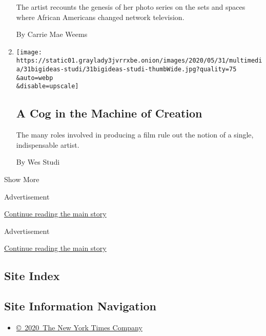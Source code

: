 \begin{enumerate}
  The artist recounts the genesis of her photo series on the sets and
  spaces where African Americans changed network television.

  By Carrie Mae Weems
\item
  \href{/2020/05/31/opinion/acting-movies-art.html}{}

  \texttt{[image: https://static01.graylady3jvrrxbe.onion/images/2020/05/31/multimedia/31bigideas-studi/31bigideas-studi-thumbWide.jpg?quality=75\\\&auto=webp\\\&disable=upscale]}

  \hypertarget{a-cog-in-the-machine-of-creation}{%
  \subsection{A Cog in the Machine of
  Creation}\label{a-cog-in-the-machine-of-creation}}

  The many roles involved in producing a film rule out the notion of a
  single, indispensable artist.

  By Wes Studi
\end{enumerate}

Show More

Advertisement

\protect\hyperlink{after-mid1}{Continue reading the main story}

Advertisement

\protect\hyperlink{after-mktg}{Continue reading the main story}

\hypertarget{site-index}{%
\subsection{Site Index}\label{site-index}}

\hypertarget{site-information-navigation}{%
\subsection{Site Information
Navigation}\label{site-information-navigation}}

\begin{itemize}
\tightlist
\item
  \href{https://help.nytimes3xbfgragh.onion/hc/en-us/articles/115014792127-Copyright-notice}{©~2020~The
  New York Times Company}
\end{itemize}

